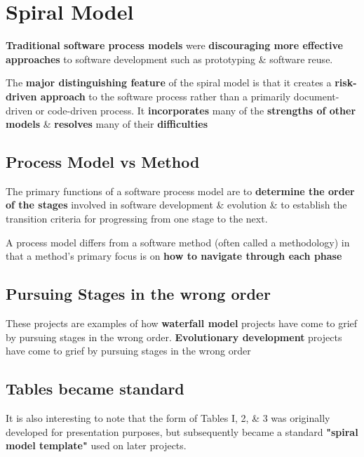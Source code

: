 \documentclass{report}
\begin{document}
\chapter{Spiral Model}
\noindent\textbf{Traditional software process models} were \textbf{discouraging more effective approaches} to software development such as prototyping \& software reuse.\newline

\noindent The \textbf{major distinguishing feature} of the spiral model is that it creates a \textbf{risk-driven approach} to the software process rather than a primarily document-driven or code-driven process. It \textbf{incorporates} many of the \textbf{strengths of other models} \& \textbf{resolves} many of their \textbf{difficulties}

\section{Process Model vs Method}
\noindent The primary functions of a software process model are to \textbf{determine the order of the stages} involved in software development \& evolution \& to establish the transition criteria for progressing from one stage to the next.\newline

\noindent A process model differs from a software method (often called a methodology) in that a method’s primary focus is on \textbf{how to navigate through each phase}

\section{Pursuing Stages in the wrong order}
\noindent These projects are examples of how \textbf{waterfall model} projects have come to grief by pursuing stages in the wrong order. \textbf{Evolutionary development} projects have come to grief by pursuing stages in the wrong order

\section{Tables became standard}
\noindent It is also interesting to note that the form of Tables I, 2, \& 3 was originally developed for presentation purposes, but subsequently became a standard \textbf{"spiral model template"} used on later projects.
\end{document}
